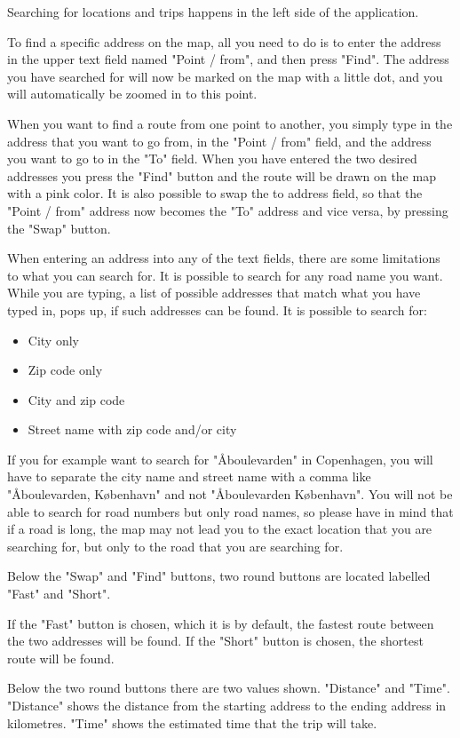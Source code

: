Searching for locations and trips happens in the left side of the application.

To find a specific address on the map, all you need to do is to enter the address in the upper text field named "Point / from", and then press "Find". The address you have searched for will now be marked on the map with a little dot, and you will automatically be zoomed in to this point.

When you want to find a route from one point to another, you simply type in the address that you want to go from, in the "Point / from" field, and the address you want to go to in the "To" field. When you have entered the two desired addresses you press the "Find" button and the route will be drawn on the map with a pink color. 
It is also possible to swap the to address field, so that the "Point / from" address now becomes the "To" address and vice versa, by pressing the "Swap" button.

When entering an address into any of the text fields, there are some limitations to what you can search for. It is possible to search for any road name you want. While you are typing, a list of possible addresses that match what you have typed in, pops up, if such addresses can be found. It is possible to search for:
\begin{itemize}
	\item City only
	\item Zip code only
	\item City and zip code
	\item Street name with zip code and/or city
\end{itemize}
If you for example want to search for "\AA boulevarden" in Copenhagen, you will have to separate the city name and street name with a comma like "\AA boulevarden, K\o benhavn" and not "\AA boulevarden K\o benhavn". You will not be able to search for road numbers but only road names, so please have in mind that if a road is long, the map may not lead you to the exact location that you are searching for, but only to the road that you are searching for.

Below the "Swap" and "Find" buttons, two round buttons are located labelled "Fast" and "Short".

If the "Fast" button is chosen, which it is by default, the fastest route between the two addresses will be found. If the "Short" button is chosen, the shortest route will be found.

Below the two round buttons there are two values shown. "Distance" and "Time". "Distance" shows the distance from the starting address to the ending address in kilometres. "Time" shows the estimated time that the trip will take.

